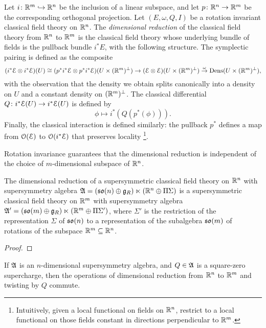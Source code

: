 \documentclass[10pt, oneside]{article}
\begin{document}
\begin{definition}
Let $i\colon \mathbb R^m \hookrightarrow \mathbb R^n$ be the inclusion of a linear subspace, and let $p \colon \mathbb R^n \to \mathbb R^m$ be the corresponding orthogonal projection. Let $(E, \omega, Q, I)$ be a rotation invariant classical field theory on $\mathbb R^n$.  The \emph{dimensional reduction} of the classical field theory from $\mathbb R^n$ to $\mathbb R^m$ is the classical field theory whose underlying bundle of fields is the pullback bundle $i^*E$, with the following structure.  The symplectic pairing is defined as the composite
\[(i^*\mathcal{E} \otimes i^*\mathcal{E})(U) \cong (p^*i^*\mathcal{E} \otimes p^*i^*\mathcal{E})(U \times (\mathbb R^m)^\perp) \to (\mathcal{E} \otimes \mathcal{E})(U \times (\mathbb R^m)^\perp) \overset \omega \to \operatorname{Dens}(U \times (\mathbb R^m)^\perp),\]
with the observation that the density we obtain splits canonically into a density on $U$ and a constant density on $(\mathbb R^m)^\perp$.  The classical differential $Q \colon i^*\mathcal{E}(U) \to i^*\mathcal{E}(U)$ is defined by
\[\phi \mapsto i^*(Q(p^*(\phi))).\]
Finally, the classical interaction is defined similarly: the pullback $p^*$ defines a map from $\mathcal{O}(\mathcal{E})$ to $\mathcal{O}(i^*\mathcal{E})$ that preserves locality \footnote{Intuitively, given a local functional on fields on $\mathbb R^n$, restrict to a local functional on those fields constant in directions perpendicular to $\mathbb R^m$.}.
\end{definition}

Rotation invariance guarantees that the dimensional reduction is independent of the choice of $m$-dimensional subspace of $\mathbb R^n$.

\begin{prop} \label{dim_red_SUSY_prop}
The dimensional reduction of a supersymmetric classical field theory on $\mathbb R^n$ with supersymmetry algebra $\mathfrak{A} = (\mathfrak{so}(n) \oplus \mathfrak{g}_R) \ltimes (\mathbb R^n \oplus \Pi \Sigma)$ is a supersymmetric classical field theory on $\mathbb R^m$ with supersymmetry algebra $\mathfrak{A}' = (\mathfrak{so}(m) \oplus \mathfrak{g}_R) \ltimes (\mathbb R^m \oplus \Pi \Sigma')$, where $\Sigma'$ is the restriction of the representation $\Sigma$ of $\mathfrak{so}(n)$ to a representation of the subalgebra $\mathfrak{so}(m)$ of rotations of the subspace $\mathbb R^m \subseteq \mathbb R^n$.
\end{prop}

\begin{proof}
\end{proof}


\begin{lemma}
If $\mathfrak{A}$ is an $n$-dimensional supersymmetry algebra, and $Q \in \mathfrak{A}$ is a square-zero supercharge, then the operations of dimensional reduction from $\mathbb R^n$ to $\mathbb R^m$ and twisting by $Q$ commute.
\end{lemma}
\end{document}
